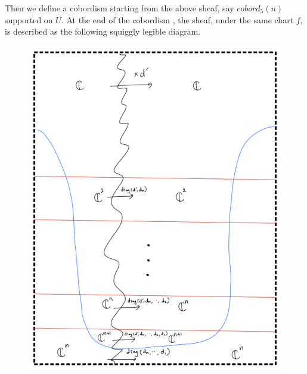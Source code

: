Then we define a cobordism starting from the above sheaf, say $cobord_5(n)$ supported on $U$. At the end of the cobordism , the sheaf, under the same chart $f$, is described as the following squiggly legible diagram. 

\begin{figure}[H]
    \centering
    \includegraphics[scale = 0.95]{diagrams/cobord5/7.png} 
    \caption{}
    \label{fig:your-label}
\end{figure}

